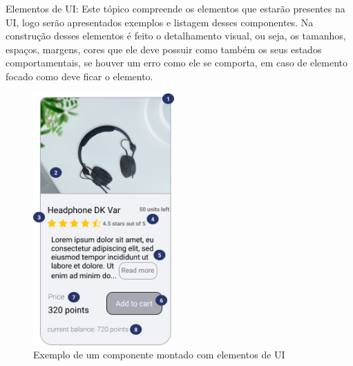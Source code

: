 {\newpage
Elementos de UI: Este tópico compreende os elementos que estarão presentes na UI, logo serão apresentados exemplos e listagem desses componentes. Na construção desses elementos é feito o detalhamento visual, ou seja, os tamanhos, espaços, margens, cores que ele deve possuir como também os seus estados comportamentais, se houver um erro como ele se comporta, em caso de elemento focado como deve ficar o elemento.

\begin{figure}
        \begin{center}
    	\includegraphics[width=0.48\textwidth]{images/ui-exemplo.png}
        
        \end{center}
        \caption{Exemplo de um componente montado com elementos de UI}
\end{figure} 

}
